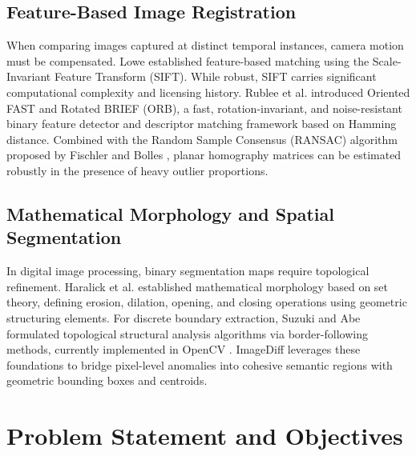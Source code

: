 \documentclass[conference]{IEEEtran}
\begin{document}
\subsection{Feature-Based Image Registration}
When comparing images captured at distinct temporal instances, camera motion must be compensated. Lowe \cite{lowe2004distinctive} established feature-based matching using the Scale-Invariant Feature Transform (SIFT). While robust, SIFT carries significant computational complexity and licensing history. Rublee et al. \cite{rublee2011orb} introduced Oriented FAST and Rotated BRIEF (ORB), a fast, rotation-invariant, and noise-resistant binary feature detector and descriptor matching framework based on Hamming distance. Combined with the Random Sample Consensus (RANSAC) algorithm proposed by Fischler and Bolles \cite{fischler1981random}, planar homography matrices can be estimated robustly in the presence of heavy outlier proportions.

\subsection{Mathematical Morphology and Spatial Segmentation}
In digital image processing, binary segmentation maps require topological refinement. Haralick et al. \cite{haralick1987image} established mathematical morphology based on set theory, defining erosion, dilation, opening, and closing operations using geometric structuring elements. For discrete boundary extraction, Suzuki and Abe \cite{suzuki1985topological} formulated topological structural analysis algorithms via border-following methods, currently implemented in OpenCV \cite{bradski2000opencv}. ImageDiff leverages these foundations to bridge pixel-level anomalies into cohesive semantic regions with geometric bounding boxes and centroids.

\section{Problem Statement and Objectives}
\end{document}
